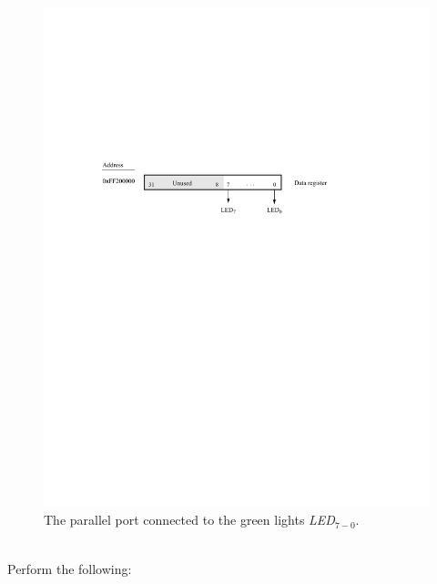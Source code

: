 \documentclass[epsfig,10pt,fullpage]{article}
\begin{document}
\begin{figure}[htb]
	\begin{center}
	\includegraphics[scale=1]{figures/figureLED.pdf}
	\end{center}
	\caption{The parallel port connected to the green lights {\it LED}$_{7-0}$.}
\label{fig:LED}
\end{figure}

~\\
\noindent
Perform the following:
\end{document}
